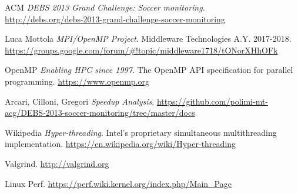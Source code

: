 \documentclass[a4paper, 11pt]{article}
\begin{document}
\begin{multicols}{2}
\begin{thebibliography}{9}
 ACM \emph{DEBS 2013 Grand Challenge: Soccer monitoring}. \\ \url{http://debs.org/debs-2013-grand-challenge-soccer-monitoring}

 Luca Mottola \emph{MPI/OpenMP Project}. Middleware Technologies A.Y. 2017-2018. \\
\url{https://groups.google.com/forum/#!topic/middleware1718/tONorXHhOFk}

 OpenMP \emph{Enabling HPC since 1997}. The OpenMP API specification for parallel programming. \url{https://www.openmp.org}

 Arcari, Cilloni, Gregori \emph{Speedup Analysis}. \url{https://github.com/polimi-mt-acg/DEBS-2013-soccer-monitoring/tree/master/docs}

 Wikipedia \emph{Hyper-threading}. Intel's proprietary simultaneous multithreading  implementation. \url{https://en.wikipedia.org/wiki/Hyper-threading}

 Valgrind. \url{http://valgrind.org}

 Linux Perf. \url{https://perf.wiki.kernel.org/index.php/Main_Page}
\end{thebibliography}

\end{multicols}
\end{document}
